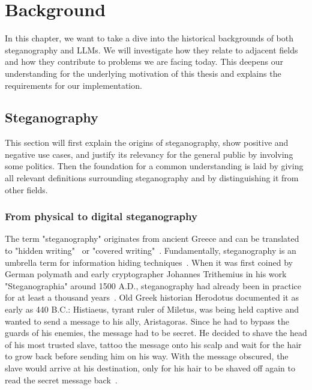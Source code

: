 
\chapter{Background}\label{ch:background}
\glsresetall %

In this chapter, we want to take a dive into the historical backgrounds of both steganography and \glspl{LLM}. We will investigate how they relate to adjacent fields and how they contribute to problems we are facing today. This deepens our understanding for the underlying motivation of this thesis and explains the requirements for our implementation.

\section{Steganography}
\label{sec:steganography}
This section will first explain the origins of steganography, show positive and negative use cases, and justify its relevancy for the general public by involving some politics. Then the foundation for a common understanding is laid by giving all relevant definitions surrounding steganography and by distinguishing it from other fields.

\subsection{From physical to digital steganography}
\label{sec:fromPhysicalToDigitalSteganography}
The term "steganography" originates from ancient Greece and can be translated to "hidden writing"~\cite{kolataVeiledMessagesTerror2001,dembartEndUserHide2001} or "covered writing"~\cite{salleeModelBasedSteganography2004,petitcolasInformationHidingSurvey1999,bennettLinguisticSteganographySurvey2004}. Fundamentally, steganography is an umbrella term for information hiding techniques~\cite{bennettLinguisticSteganographySurvey2004}. When it was first coined by German polymath and early cryptographer Johannes Trithemius in his work "Steganographia" around 1500 A.D., steganography had already been in practice for at least a thousand years~\cite{bennettLinguisticSteganographySurvey2004}. Old Greek historian Herodotus documented it as early as 440 B.C.: Histiaeus, tyrant ruler of Miletus, was being held captive and wanted to send a message to his ally, Aristagoras. Since he had to bypass the guards of his enemies, the message had to be secret. He decided to shave the head of his most trusted slave, tattoo the message onto his scalp and wait for the hair to grow back before sending him on his way. With the message obscured, the slave would arrive at his destination, only for his hair to be shaved off again to read the secret message back~\cite{bennettLinguisticSteganographySurvey2004,petitcolasInformationHidingSurvey1999,dembartEndUserHide2001}.

